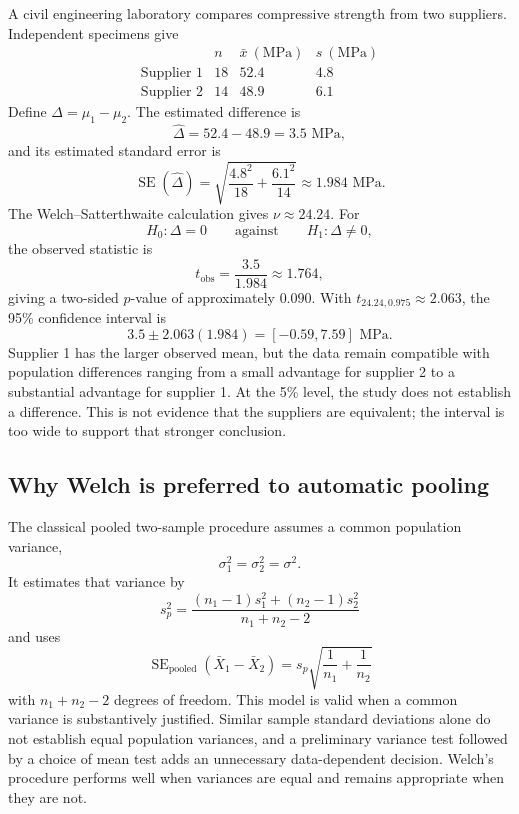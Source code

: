 \begin{example}\par
A civil engineering laboratory compares compressive strength from two suppliers. Independent specimens give
\[
\begin{array}{c|ccc}
& n & \bar x\ (\text{MPa}) & s\ (\text{MPa})\\
\hline
\text{Supplier 1} & 18 & 52.4 & 4.8\\
\text{Supplier 2} & 14 & 48.9 & 6.1
\end{array}
\]
Define $\Delta=\mu_1-\mu_2$. The estimated difference is
\[
\widehat\Delta=52.4-48.9=3.5\text{ MPa},
\]
and its estimated standard error is
\[
\operatorname{SE}(\widehat\Delta)
=\sqrt{\frac{4.8^2}{18}+\frac{6.1^2}{14}}
\approx1.984\text{ MPa}.
\]
The Welch--Satterthwaite calculation gives $\nu\approx24.24$. For
\[
H_0:\Delta=0
\qquad\text{against}\qquad
H_1:\Delta\neq0,
\]
the observed statistic is
\[
t_{\mathrm{obs}}=\frac{3.5}{1.984}\approx1.764,
\]
giving a two-sided $p$-value of approximately $0.090$. With $t_{24.24,0.975}\approx2.063$, the 95\% confidence interval is
\[
3.5\pm2.063(1.984)
=[-0.59,7.59]\text{ MPa}.
\]
Supplier 1 has the larger observed mean, but the data remain compatible with population differences ranging from a small advantage for supplier 2 to a substantial advantage for supplier 1. At the 5\% level, the study does not establish a difference. This is not evidence that the suppliers are equivalent; the interval is too wide to support that stronger conclusion.
\end{example}

\subsection{Why Welch is preferred to automatic pooling}

The classical pooled two-sample procedure assumes a common population variance,
\[
\sigma_1^2=\sigma_2^2=\sigma^2.
\]
It estimates that variance by
\[
s_p^2
=
\frac{(n_1-1)s_1^2+(n_2-1)s_2^2}
{n_1+n_2-2}
\]
and uses
\[
\operatorname{SE}_{\mathrm{pooled}}(\bar X_1-\bar X_2)
=s_p\sqrt{\frac{1}{n_1}+\frac{1}{n_2}}
\]
with $n_1+n_2-2$ degrees of freedom. This model is valid when a common variance is substantively justified. Similar sample standard deviations alone do not establish equal population variances, and a preliminary variance test followed by a choice of mean test adds an unnecessary data-dependent decision. Welch's procedure performs well when variances are equal and remains appropriate when they are not.

